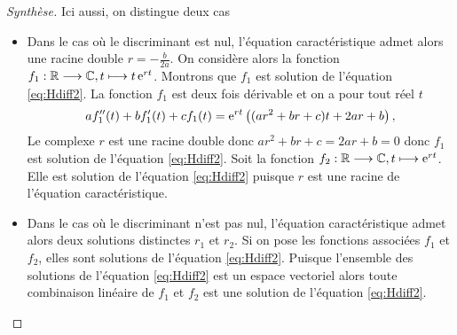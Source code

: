 \begin{proof}[Synthèse]
  Ici aussi, on distingue deux cas
\begin{itemize}
\item Dans le cas où le discriminant est nul, l'équation caractéristique admet alors une racine double \(r=-\frac{b}{2a}\). On considère alors la fonction \(f_1:\mathbb{R} \longrightarrow \mathbb{C}, t \longmapsto t\operatorname{e}^{rt}\). Montrons que \(f_1\) est solution de l'équation \eqref{eq:Hdiff2}. La fonction \(f_1\) est deux fois dérivable et on a pour tout réel \(t\)
  \begin{equation}
    af_1''(t)+bf_1'(t)+cf_1(t)=\operatorname{e}^{rt} \left( (ar^2+br+c)t + 2ar+b \right),
  \end{equation}
Le complexe \(r\) est une racine double donc \(ar^2+br+c=2ar+b=0\) donc \(f_1\) est solution de l'équation \eqref{eq:Hdiff2}. Soit la fonction \(f_2:\mathbb{R} \longrightarrow \mathbb{C}, t \longmapsto \operatorname{e}^{rt}\). Elle est solution de l'équation \eqref{eq:Hdiff2} puisque \(r\) est une racine de l'équation caractéristique.
\item Dans le cas où le discriminant n'est pas nul, l'équation caractéristique admet alors deux solutions distinctes \(r_1\) et \(r_2\). Si on pose les fonctions associées \(f_1\) et \(f_2\), elles sont solutions de l'équation \eqref{eq:Hdiff2}. Puisque l'ensemble des solutions de l'équation \eqref{eq:Hdiff2} est un espace vectoriel alors toute combinaison linéaire de \(f_1\) et \(f_2\) est une solution de l'équation \eqref{eq:Hdiff2}.
\end{itemize}
\end{proof}
%
